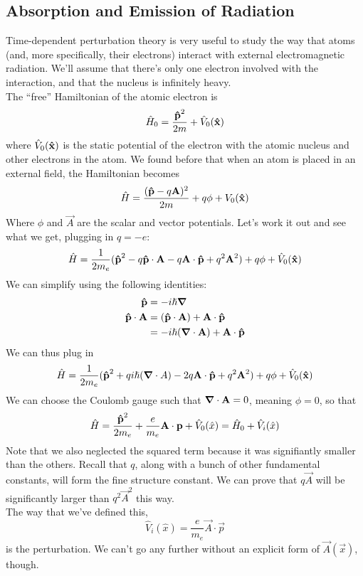 \documentclass[a4paper]{article}
\begin{document}
\subsection{Absorption and Emission of Radiation}
Time-dependent perturbation theory is very useful to study the way that atoms
(and, more specifically, their electrons) interact with external
electromagnetic radiation. We'll assume that there's only one electron
involved with the interaction, and that the nucleus is infinitely heavy.\\
The ``free'' Hamiltonian of the atomic electron is
	\[ \hat{H}_0 = \frac{\boldsymbol{\mathbf{\hat{p}}}^2}{2m} + \hat{V}_0(\boldsymbol{\mathbf{\hat{x}}}) \]
where $\hat{V}_0(\boldsymbol{\mathbf{\hat{x}}})$ is the static potential of the electron with the
atomic nucleus and other electrons in the atom. We found before that when
an atom is placed in an external field, the Hamiltonian becomes
\[
	\hat{H} = \frac{(\boldsymbol{\mathbf{\hat{p}}}-q\boldsymbol{\mathbf{A}})^2}{2m} + q\phi + V_0(\boldsymbol{\mathbf{\hat{x}}})
\]
Where $\phi$ and $\vec{A}$ are the scalar and vector potentials. Let's work
it out and see what we get, plugging in $q=-e$:
\[
	\hat{H} = \frac{1}{2m_e}(\boldsymbol{\mathbf{\hat{p}}}^2 - q\boldsymbol{\mathbf{\hat{p}}}\cdot\boldsymbol{\mathbf{A}} -
		q\boldsymbol{\mathbf{A}}\cdot\boldsymbol{\mathbf{\hat{p}}} + q^2\boldsymbol{\mathbf{A}}^2) + q\phi +
		\hat{V}_0(\boldsymbol{\mathbf{\hat{x}}})
\]
We can simplify using the following identities:
\begin{align*}
	\boldsymbol{\mathbf{\hat{p}}} &= -i\hslash\boldsymbol{\mathbf{\nabla}}\\
	\boldsymbol{\mathbf{\hat{p}}}\cdot\boldsymbol{\mathbf{A}} &=(\boldsymbol{\mathbf{\hat{p}}}\cdot\boldsymbol{\mathbf{A}}) + \boldsymbol{\mathbf{A}}\cdot\boldsymbol{\mathbf{\hat{p}}}\\
			     &=-i\hslash(\boldsymbol{\mathbf{\nabla}}\cdot\boldsymbol{\mathbf{A}})+\boldsymbol{\mathbf{A}}\cdot\boldsymbol{\mathbf{\hat{p}}}
\end{align*}
We can thus plug in
\[
	\hat{H} = \frac{1}{2m_e}(\boldsymbol{\mathbf{\hat{p}}}^2 + qi\hslash(\boldsymbol{\mathbf{\nabla}}\cdot{A}) -
		2q\boldsymbol{\mathbf{A}}\cdot\boldsymbol{\mathbf{\hat{p}}} + q^2\boldsymbol{\mathbf{A}}^2) + q\phi +
		\hat{V}_0(\boldsymbol{\mathbf{\hat{x}}})
\]
We can choose the Coulomb gauge such that $\boldsymbol{\mathbf{\nabla}}\cdot\boldsymbol{\mathbf{A}}=0$, meaning
$\phi=0$, so that
\[
	\hat{H} = \frac{\boldsymbol{\mathbf{\hat{p}}}^2}{2m_e} + \frac{e}{m_e}\boldsymbol{\mathbf{A}}\cdot\boldsymbol{\mathbf{p}} +
		\hat{V}_0(\hat{x}) = \hat{H}_0+\hat{V}_i(\hat{x})
\]
Note that we also neglected the squared term because it was signifiantly
smaller than the others. Recall that $q$, along with a bunch of other
fundamental constants, will form the fine structure constant. We can prove that
$q\vec{A}$ will be significantly larger than $q^2\vec{A}^2$ this way.\\
The way that we've defined this,
\[
	\hat{V}_i(\hat{x}) = \frac{e}{m_e}\vec{A}\cdot\vec{p}
\]
is the perturbation. We can't go any further without an explicit form of
$\vec{A}(\vec{x})$, though.
\end{document}
